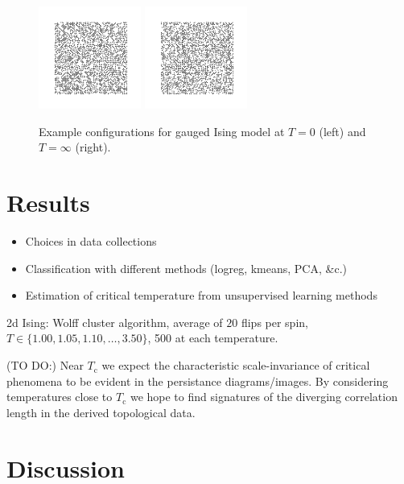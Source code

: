 \documentclass[11pt]{article}
\begin{document}
\begin{figure}[h]
    \centering
    \includegraphics[width=0.3\textwidth]{gauged_T=0.png}
    \includegraphics[width=0.3\textwidth]{gauged_T=inf.png}
    \caption{Example configurations for gauged Ising model at $T=0$ (left) and $T=\infty$ (right).}
\end{figure}


\section{Results}
\begin{itemize}
    \item Choices in data collections
    \item Classification with different methods (logreg, kmeans, PCA, \&c.)
    \item Estimation of critical temperature from unsupervised learning methods
\end{itemize}

2d Ising: Wolff cluster algorithm, average of $20$ flips per spin, $T\in\{1.00,1.05,1.10,\ldots,3.50\}$, 500 at each temperature.


(TO DO:) Near $T_\text{c}$ we expect the characteristic scale-invariance of critical phenomena to be evident in the persistance diagrams/images. By considering temperatures close to $T_\text{c}$ we hope to find signatures of the diverging correlation length in the derived topological data.


\section{Discussion}
\end{document}

